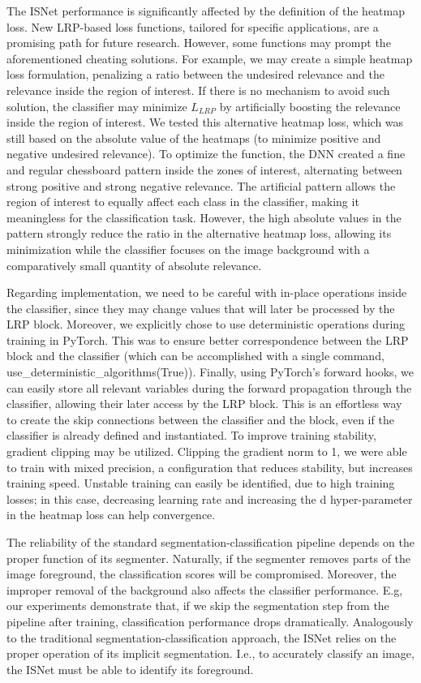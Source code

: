 \documentclass[fleqn,10pt]{wlscirep}
\begin{document}
{The ISNet performance is significantly affected by the definition of the heatmap loss. New LRP-based loss functions, tailored for specific applications, are a promising path for future research. However, some functions may prompt the aforementioned cheating solutions. For example, we may create a simple heatmap loss formulation, penalizing a ratio between the undesired relevance and the relevance inside the region of interest. If there is no mechanism to avoid such solution, the classifier may minimize $L_{LRP}$ by artificially boosting the relevance inside the region of interest. We tested this alternative heatmap loss, which was still based on the absolute value of the heatmaps (to minimize positive and negative undesired relevance). To optimize the function, the DNN created a fine and regular chessboard pattern inside the zones of interest, alternating between strong positive and strong negative relevance. The artificial pattern allows the region of interest to equally affect each class in the classifier, making it meaningless for the classification task. However, the high absolute values in the pattern strongly reduce the ratio in the alternative heatmap loss, allowing its minimization while the classifier focuses on the image background with a comparatively small quantity of absolute relevance. 

Regarding implementation, we need to be careful with in-place operations inside the classifier, since they may change values that will later be processed by the LRP block. Moreover, we explicitly chose to use deterministic operations during training in PyTorch. This was to ensure better correspondence between the LRP block and the classifier (which can be accomplished with a single command, use\_deterministic\_algorithms(True)). Finally, using PyTorch's forward hooks, we can easily store all relevant variables during the forward propagation through the classifier, allowing their later access by the LRP block. This is an effortless way to create the skip connections between the classifier and the block, even if the classifier is already defined and instantiated. To improve training stability, gradient clipping may be utilized. Clipping the gradient norm to 1, we were able to train with mixed precision, a configuration that reduces stability, but increases training speed. Unstable training can easily be identified, due to high training losses; in this case, decreasing learning rate and increasing the d hyper-parameter in the heatmap loss can help convergence.

The reliability of the standard segmentation-classification pipeline depends on the proper function of its segmenter. Naturally, if the segmenter removes parts of the image foreground, the classification scores will be compromised. Moreover, the improper removal of the background also affects the classifier performance. E.g, our experiments demonstrate that, if we skip the segmentation step from the pipeline after training, classification performance drops dramatically. Analogously to the traditional segmentation-classification approach, the ISNet relies on the proper operation of its implicit segmentation. I.e., to accurately classify an image, the ISNet must be able to identify its foreground.

}
\end{document}

